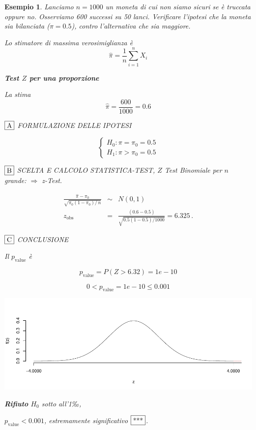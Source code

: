 \documentclass[
  11pt,
]{book}
\theoremstyle{mytheoremstyle}
\theoremstyle{mydefstyle}
\newtheorem{example}{{Esempio}}[section]
\begin{document}
\begin{example}
Lanciamo \(n=1000\) un moneta di cui non siamo sicuri se è truccata oppure
no. Osserviamo 600 successi su 50 lanci. Verificare l'ipotesi che la moneta sia bilanciata (\(\pi=0.5\)), contro
l'alternativa che sia maggiore.

Lo stimatore di massima verosimiglianza è
\[\hat\pi=\frac 1 n \sum_{i=1}^n X_i\]

\textbf{Test \(Z\) per una proporzione}

La stima
\[\hat\pi=\frac { 600 } { 1000 }= 0.6  \]

\(\fbox{A}\) FORMULAZIONE DELLE IPOTESI

\[\begin{cases}
   H_0: \pi = \pi_0=0.5 \\
   H_1: \pi > \pi_0=0.5 
   \end{cases}\]

\(\fbox{B}\) SCELTA E CALCOLO STATISTICA-TEST, \(Z\)
Test Binomiale per \(n\) grande: \(\Rightarrow\) z-Test.

\begin{eqnarray*}
   \frac{\hat\pi - \pi_{0}} {\sqrt {\pi_0(1-\pi_0)/\,n}}&\sim&N(0,1)\\
   z_{\text{obs}}
   &=& \frac{ ( 0.6 -  0.5 )} {\sqrt{ 0.5 (1- 0.5 )/ 1000 }}
   =   6.325 \,.
   \end{eqnarray*}

\(\fbox{C}\) CONCLUSIONE

Il \(p_{\text{value}}\) è

\[ p_{\text{value}} = P(Z>6.32)=1e-10 \]

\[
 0 < p_\text{value}= 1e-10 \leq 0.001 
\]

\begin{center}\includegraphics{Appunti_di_Statistica_2025_files/figure-latex/15-test-mu-pi-11-1} \end{center}

\textbf{Rifiuto} \(H_0\) sotto all'1‰,

\(p_\text{value}<0.001\), \emph{estremamente significativo} \(\fbox{***}\).
\end{example}
\end{document}
